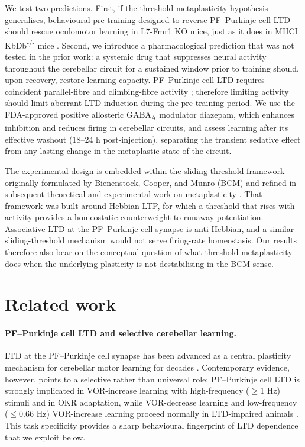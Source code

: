 We test two predictions. First, if the threshold metaplasticity hypothesis generalises, behavioural pre-training designed to reverse PF--Purkinje cell LTD should rescue oculomotor learning in L7-Fmr1 KO mice, just as it does in MHCI KbDb\textsuperscript{-/-} mice \cite{nguyenvu2017saturation}. Second, we introduce a pharmacological prediction that was not tested in the prior work: a systemic drug that suppresses neural activity throughout the cerebellar circuit for a sustained window prior to training should, upon recovery, restore learning capacity. PF--Purkinje cell LTD requires coincident parallel-fibre and climbing-fibre activity \cite{nguyenvu2017saturation,levram2003reversing}; therefore limiting activity should limit aberrant LTD induction during the pre-training period. We use the FDA-approved positive allosteric GABA\textsubscript{A} modulator diazepam, which enhances inhibition and reduces firing in cerebellar circuits, and assess learning after its effective washout (18--24 h post-injection), separating the transient sedative effect from any lasting change in the metaplastic state of the circuit.

The experimental design is embedded within the sliding-threshold framework originally formulated by Bienenstock, Cooper, and Munro (BCM) \cite{abraham1996metaplasticity} and refined in subsequent theoretical and experimental work on metaplasticity \cite{abraham1996metaplasticity}. That framework was built around Hebbian LTP, for which a threshold that rises with activity provides a homeostatic counterweight to runaway potentiation. Associative LTD at the PF--Purkinje cell synapse is anti-Hebbian, and a similar sliding-threshold mechanism would not serve firing-rate homeostasis. Our results therefore also bear on the conceptual question of what threshold metaplasticity does when the underlying plasticity is not destabilising in the BCM sense.

\section{Related work}

\paragraph{PF--Purkinje cell LTD and selective cerebellar learning.}
LTD at the PF--Purkinje cell synapse has been advanced as a central plasticity mechanism for cerebellar motor learning for decades \cite{boyden2004cerebellum}. Contemporary evidence, however, points to a selective rather than universal role: PF--Purkinje cell LTD is strongly implicated in VOR-increase learning with high-frequency (\(\geq\)1 Hz) stimuli and in OKR adaptation, while VOR-decrease learning and low-frequency (\(\leq\)0.66 Hz) VOR-increase learning proceed normally in LTD-impaired animals \cite{boyden2004cerebellum,raymond2018cerebellum,kimpo2005vor,kimpo2014gating,inoshita2018okr,takeuchi2008delphilin,rowan2018graded,nguyenvu2017saturation}. This task specificity provides a sharp behavioural fingerprint of LTD dependence that we exploit below.

